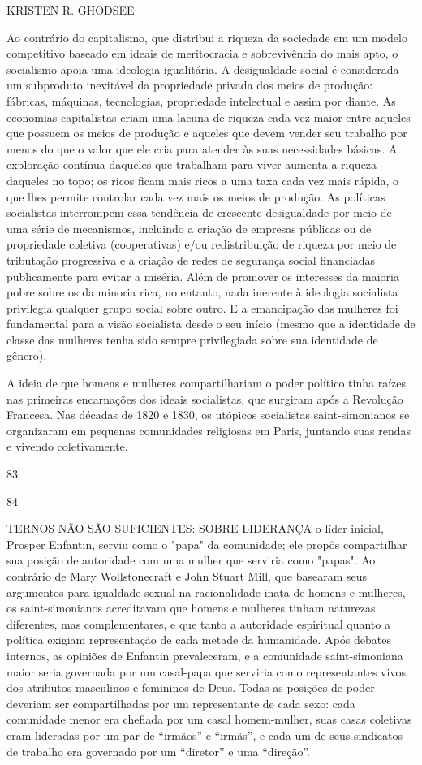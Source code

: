  \par 
KRISTEN R. GHODSEE
 \par 
Ao contrário do capitalismo, que distribui a riqueza da sociedade em um modelo competitivo baseado em ideais de meritocracia e sobrevivência do mais apto, o socialismo apoia uma ideologia igualitária. A desigualdade social é considerada um subproduto inevitável da propriedade privada dos meios de produção: fábricas, máquinas, tecnologias, propriedade intelectual e assim por diante. As economias capitalistas criam uma lacuna de riqueza cada vez maior entre aqueles que possuem os meios de produção e aqueles que devem vender seu trabalho por menos do que o valor que ele cria para atender às suas necessidades básicas. A exploração contínua daqueles que trabalham para viver aumenta a riqueza daqueles no topo; os ricos ficam mais ricos a uma taxa cada vez mais rápida, o que lhes permite controlar cada vez mais os meios de produção. As políticas socialistas interrompem essa tendência de crescente desigualdade por meio de uma série de mecanismos, incluindo a criação de empresas públicas ou de propriedade coletiva (cooperativas) e/ou redistribuição de riqueza por meio de tributação progressiva e a criação de redes de segurança social financiadas publicamente para evitar a miséria. Além de promover os interesses da maioria pobre sobre os da minoria rica, no entanto, nada inerente à ideologia socialista privilegia qualquer grupo social sobre outro. E a emancipação das mulheres foi fundamental para a visão socialista desde o seu início (mesmo que a identidade de classe das mulheres tenha sido sempre privilegiada sobre sua identidade de gênero).
 \par 
A ideia de que homens e mulheres compartilhariam o poder político tinha raízes nas primeiras encarnações dos ideais socialistas, que surgiram após a Revolução Francesa. Nas décadas de 1820 e 1830, os utópicos socialistas saint-simonianos se organizaram em pequenas comunidades religiosas em Paris, juntando suas rendas e vivendo coletivamente.
 \par 
83
 \par 
84
 \par 
TERNOS NÃO SÃO SUFICIENTES: SOBRE LIDERANÇA o líder inicial, Prosper Enfantin, serviu como o "papa" da comunidade; ele propôs compartilhar sua posição de autoridade com uma mulher que serviria como "papas". Ao contrário de Mary Wollstonecraft e John Stuart Mill, que basearam seus argumentos para igualdade sexual na racionalidade inata de homens e mulheres, os saint-simonianos acreditavam que homens e mulheres tinham naturezas diferentes, mas complementares, e que tanto a autoridade espiritual quanto a política exigiam representação de cada metade da humanidade. Após debates internos, as opiniões de Enfantin prevaleceram, e a comunidade saint-simoniana maior seria governada por um casal-papa que serviria como representantes vivos dos atributos masculinos e femininos de Deus. Todas as posições de poder deveriam ser compartilhadas por um representante de cada sexo: cada comunidade menor era chefiada por um casal homem-mulher, suas casas coletivas eram lideradas por um par de “irmãos” e “irmãs”, e cada um de seus sindicatos de trabalho era governado por um “diretor” e uma “direção”.
